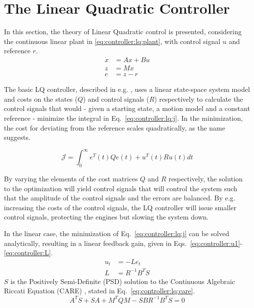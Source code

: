 \section{The Linear Quadratic Controller}
\label{sec:controller:lq}
    In this section, the theory of Linear Quadratic control is presented,
    considering the continuous linear plant in \eqref{eq:controller:lq:plant},
    with control signal $u$ and reference $r$.
    \begin{subequations}
        \label{eq:controller:lq:plant}
        \begin{align}
            \dot{x} &= Ax + Bu \\
%
            z &= Mx \\
%
            e &= z - r
        \end{align}
    \end{subequations}

    The basic LQ controller, described in e.g. \citep{glad2003reglerteori},
    uses a linear state-space system model and costs on the states ($Q$) and control
    signals ($R$) respectively to calculate the control signals that would
    - given a starting state, a motion model and a constant reference -
    minimize the integral in Eq.~\eqref{eq:controller:lq:j}.
    In the minimization, the cost for deviating from the reference scales
    quadratically, as the name suggests.

    \begin{equation}
    \label{eq:controller:lq:j}
        \mathcal{J} = \int_{0}^{\infty} e^{T}(t)Qe(t) + u^{T}(t)Ru(t) dt
    \end{equation}

    By varying the elements of the cost matrices $Q$ and $R$
    respectively, the solution to the optimization will yield control
    signals that will control the system such that the amplitude
    of the control signals and the errors are balanced.
    By e.g. increasing the costs of the control signals, the
    LQ controller will issue smaller control signals, protecting the
    engines but slowing the system down.

    In the linear case, the minimization of Eq.~\eqref{eq:controller:lq:j} can be solved analytically,
    resulting in a linear feedback gain, given in Eqs.~\eqref{eq:controller:u1}-\eqref{eq:controller:L}.
    \begin{align}
        u_{t} &= -Le_{t} \label{eq:controller:u1} \\
%
        L &= R^{-1}B^{T}S \label{eq:controller:L}
    \end{align}
    $S$ is the Positively Semi-Definite (PSD) solution to the
    Continuous Algebraic Riccati Equation (CARE) \citep{glad2003reglerteori},
    stated in Eq.~\eqref{eq:controller:lq:care}.
    \begin{equation}
        \label{eq:controller:lq:care}
        A^{T}S + SA + M^{T}QM - SBR^{-1}B^{T}S = 0
    \end{equation}

